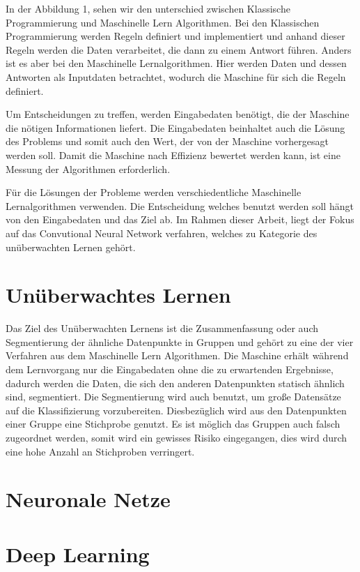 \documentclass[12pt,titlepage]{article}
\begin{document}
In der Abbildung 1, sehen wir den unterschied zwischen Klassische Programmierung und Maschinelle Lern Algorithmen. Bei den Klassischen Programmierung werden Regeln definiert und implementiert und anhand dieser Regeln werden die Daten verarbeitet, die dann zu einem Antwort führen. Anders ist es aber bei den Maschinelle Lernalgorithmen. Hier werden Daten und dessen Antworten als Inputdaten betrachtet, wodurch die Maschine für sich die Regeln definiert.

Um Entscheidungen zu treffen, werden Eingabedaten benötigt, die der Maschine die nötigen Informationen liefert. Die Eingabedaten beinhaltet auch die Lösung des Problems und somit auch den Wert, der von der Maschine vorhergesagt werden soll. Damit die Maschine nach Effizienz bewertet werden kann, ist eine Messung der Algorithmen erforderlich.

Für die Lösungen der Probleme werden verschiedentliche Maschinelle Lernalgorithmen verwenden. Die Entscheidung welches benutzt werden soll hängt von den Eingabedaten und das Ziel ab. Im Rahmen dieser Arbeit, liegt der Fokus auf das Convutional Neural Network verfahren, welches zu Kategorie des unüberwachten Lernen gehört.

\section{Unüberwachtes Lernen}

Das Ziel des Unüberwachten Lernens ist die Zusammenfassung oder auch Segmentierung der ähnliche Datenpunkte in Gruppen und gehört zu eine der vier Verfahren aus dem Maschinelle Lern Algorithmen. Die Maschine erhält während dem Lernvorgang nur die Eingabedaten ohne die zu erwartenden Ergebnisse, dadurch werden die Daten, die sich den anderen Datenpunkten statisch ähnlich sind, segmentiert. Die Segmentierung wird auch benutzt, um große Datensätze auf die Klassifizierung vorzubereiten. Diesbezüglich wird aus den Datenpunkten einer Gruppe eine Stichprobe genutzt. Es ist möglich das Gruppen auch falsch zugeordnet werden, somit wird ein gewisses Risiko eingegangen, dies wird durch eine hohe Anzahl an Stichproben verringert.

\section{Neuronale Netze}

\section{Deep Learning}
\end{document}
